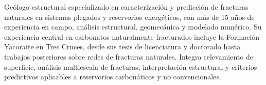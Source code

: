 \documentclass[10pt, a4paper]{awesome-cv}
\begin{document}
\makecvheader[C]
\vspace{-5mm}

\begin{cvparagraph}
Geólogo estructural especializado en caracterización y predicción de fracturas naturales en sistemas plegados y reservorios energéticos, con más de 15 años de experiencia en campo, análisis estructural, geomecánica y modelado numérico. Su experiencia central en carbonatos naturalmente fracturados incluye la Formación Yacoraite en Tres Cruces, desde sus tesis de licenciatura y doctorado hasta trabajos posteriores sobre redes de fracturas naturales. Integra relevamiento de superficie, análisis multiescala de fracturas, interpretación estructural y criterios predictivos aplicables a reservorios carbonáticos y no convencionales.
\end{cvparagraph}

\vspace{-2mm}
\end{document}
